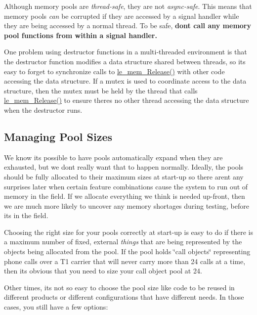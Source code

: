 Although memory pools are {\itshape thread-\/safe}, they are not {\itshape async-\/safe}. This means that memory pools {\itshape can} be corrupted if they are accessed by a signal handler while they are being accessed by a normal thread. To be safe, {\bfseries  don\textquotesingle{}t call any memory pool functions from within a signal handler. }

One problem using destructor functions in a multi-\/threaded environment is that the destructor function modifies a data structure shared between threads, so it\textquotesingle{}s easy to forget to synchronize calls to {\ttfamily \hyperlink{le__mem_8h_a6d8e3fe430bcb81efe97b57ce30ef2de}{le\+\_\+mem\+\_\+\+Release()}} with other code accessing the data structure. If a mutex is used to coordinate access to the data structure, then the mutex must be held by the thread that calls \hyperlink{le__mem_8h_a6d8e3fe430bcb81efe97b57ce30ef2de}{le\+\_\+mem\+\_\+\+Release()} to ensure there\textquotesingle{}s no other thread accessing the data structure when the destructor runs.\hypertarget{c_memory_mem_pool_sizes}{}\subsection{Managing Pool Sizes}\label{c_memory_mem_pool_sizes}
We know it\textquotesingle{}s possible to have pools automatically expand when they are exhausted, but we don\textquotesingle{}t really want that to happen normally. Ideally, the pools should be fully allocated to their maximum sizes at start-\/up so there aren\textquotesingle{}t any surprises later when certain feature combinations cause the system to run out of memory in the field. If we allocate everything we think is needed up-\/front, then we are much more likely to uncover any memory shortages during testing, before it\textquotesingle{}s in the field.

Choosing the right size for your pools correctly at start-\/up is easy to do if there is a maximum number of fixed, external {\itshape things} that are being represented by the objects being allocated from the pool. If the pool holds \char`\"{}call objects\char`\"{} representing phone calls over a T1 carrier that will never carry more than 24 calls at a time, then it\textquotesingle{}s obvious that you need to size your call object pool at 24.

Other times, it\textquotesingle{}s not so easy to choose the pool size like code to be reused in different products or different configurations that have different needs. In those cases, you still have a few options\+:



